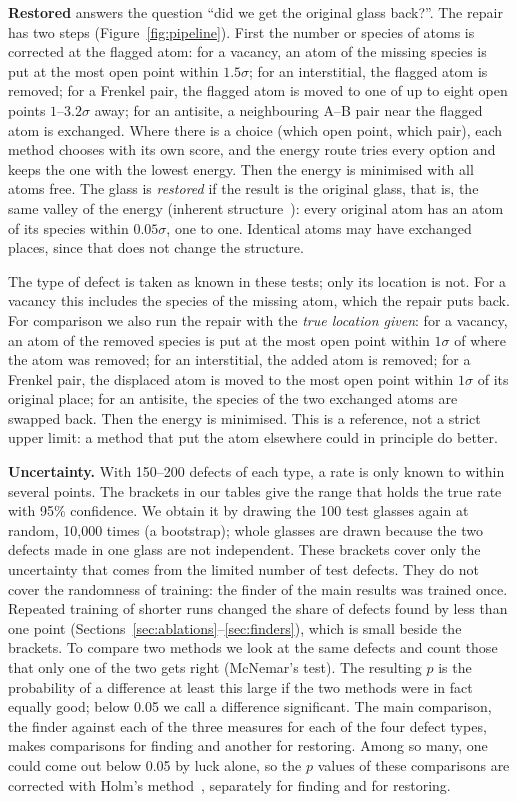 \documentclass[10pt]{article}
\makeatletter
\newcommand{\pd}[1]{\@ifundefined{pd@#1}{\textcolor{red}{[#1]}}{\csname pd@#1\endcsname}}
\makeatother
\begin{document}
\textbf{Restored} answers the question ``did we get the original glass back?''. The repair has two steps (Figure~\ref{fig:pipeline}). First the number or species of atoms is corrected at the flagged atom: for a vacancy, an atom of the missing species is put at the most open point within $1.5\sigma$; for an interstitial, the flagged atom is removed; for a Frenkel pair, the flagged atom is moved to one of up to eight open points $1$--$3.2\sigma$ away; for an antisite, a neighbouring A--B pair near the flagged atom is exchanged. Where there is a choice (which open point, which pair), each method chooses with its own score, and the energy route tries every option and keeps the one with the lowest energy. Then the energy is minimised with all atoms free. The glass is \emph{restored} if the result is the original glass, that is, the same valley of the energy (inherent structure~\citep{stillinger1982}): every original atom has an atom of its species within $0.05\sigma$, one to one. Identical atoms may have exchanged places, since that does not change the structure.

The type of defect is taken as known in these tests; only its location is not. For a vacancy this includes the species of the missing atom, which the repair puts back. For comparison we also run the repair with the \emph{true location given}: for a vacancy, an atom of the removed species is put at the most open point within $1\sigma$ of where the atom was removed; for an interstitial, the added atom is removed; for a Frenkel pair, the displaced atom is moved to the most open point within $1\sigma$ of its original place; for an antisite, the species of the two exchanged atoms are swapped back. Then the energy is minimised. This is a reference, not a strict upper limit: a method that put the atom elsewhere could in principle do better.

\textbf{Uncertainty.} With 150--200 defects of each type, a rate is only known to within several points. The brackets in our tables give the range that holds the true rate with 95\% confidence. We obtain it by drawing the 100 test glasses again at random, 10,000 times (a bootstrap); whole glasses are drawn because the two defects made in one glass are not independent. These brackets cover only the uncertainty that comes from the limited number of test defects. They do not cover the randomness of training: the finder of the main results was trained once. Repeated training of shorter runs changed the share of defects found by less than one point (Sections~\ref{sec:ablations}--\ref{sec:finders}), which is small beside the brackets. To compare two methods we look at the same defects and count those that only one of the two gets right (McNemar's test). The resulting $p$ is the probability of a difference at least this large if the two methods were in fact equally good; below 0.05 we call a difference significant. The main comparison, the finder against each of the three measures for each of the four defect types, makes \pd{n-tests-family} comparisons for finding and another \pd{n-tests-family} for restoring. Among so many, one could come out below 0.05 by luck alone, so the $p$ values of these comparisons are corrected with Holm's method~\citep{holm1979}, separately for finding and for restoring.
\end{document}
